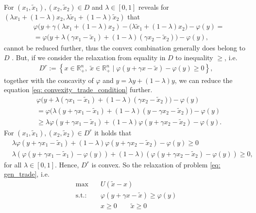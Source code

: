For $(x_1, \tilde{x}_1), (x_2, \tilde{x}_2) \in D$ and $\lambda \in [0, 1]$
reveals for $\left(\lambda x_1 + (1-\lambda)x_2, \lambda \tilde{x}_1
+(1-\lambda)\tilde{x}_2\right)$ that
\begin{align}
    &\varphi\Big( y+\gamma(\lambda x_1 + (1-\lambda)x_2) - (\lambda
    \tilde{x}_1 + (1-\lambda)x_2 \Big) - \varphi(y) =\\
    &=
    \varphi\Big(y + \lambda(\gamma x_1 - \tilde{x}_1) + (1-\lambda)(\gamma
    x_2 - \tilde{x}_2)\Big) - \varphi(y),\label{eq: convexity_trade_condition}
\end{align}
cannot be reduced further, thus the convex combination generally does belong
to $D$ . But, if we consider the relaxation from equality in $D$ to inequality
$\ge$, i.e.
\begin{align}
    D^{r} := \left\{ x \in \mathbb{R}^{n}_+,\; \tilde{x} \in \mathbb{R}^{n}_+\;
    |\;
    \varphi(y + \gamma x - \tilde{x}) - \varphi(y) \ge 0
\right\},
\end{align}
together with the concavity of $\varphi$ and $y = \lambda y + (1-\lambda)y$,
we can reduce the equation \ref{eq: convexity_trade_condition} further.
\begin{align}
    &\varphi\Big(y + \lambda(\gamma x_1 - \tilde{x}_1) + (1-\lambda)(\gamma
    x_2 - \tilde{x}_2)\Big) - \varphi(y) \\
    &=
    \varphi\Big(\lambda(y + \gamma x_1 - \tilde{x}_1) + (1-\lambda)(y - \gamma
    x_2 - \tilde{x}_2)\Big) - \varphi(y) \\
    &\ge \lambda \varphi(y + \gamma x_1 - \tilde{x}_1)
    + (1-\lambda)\varphi(y+\gamma x_2 - \tilde{x}_2) - \varphi(y).
\end{align}
For $(x_1, \tilde{x}_1), (x_2, \tilde{x}_2) \in D^{r}$ it holds that
\begin{align}
    &\lambda \varphi(y + \gamma x_1 - \tilde{x}_1)
    + (1-\lambda)\varphi(y+\gamma x_2 - \tilde{x}_2) - \varphi(y)\ge 0\\
    &\lambda \left(\varphi(y + \gamma x_1 - \tilde{x}_1) - \varphi(y)\right)
    + (1-\lambda)\left(\varphi(y+\gamma x_2 - \tilde{x}_2) -
    \varphi(y)\right)\ge 0,
\end{align}
for all $\lambda \in [0, 1]$. Hence, $D^{r}$ is convex. So the relaxation of
problem \ref{eq: gen_trade}, i.e.
\begin{align}
    \text{max} \quad &U(\tilde{x} - x) \label{eq: convex_gen_trade}\\
    \text{s.t.:}\quad & \varphi(y + \gamma x - \tilde{x}) \ge
    \varphi(y)\nonumber \\
      &x\ge 0 \qquad \tilde{x} \ge 0\nonumber
\end{align}
